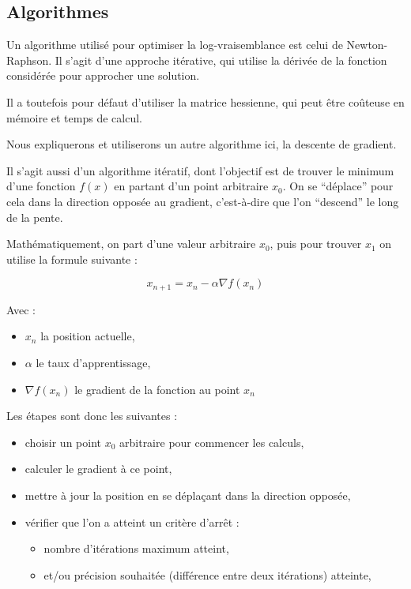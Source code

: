 \documentclass[10pt,french]{report}
\begin{document}
	\subsection{Algorithmes}

    Un algorithme utilisé pour optimiser la log-vraisemblance est celui de Newton-Raphson. Il s'agit d'une approche itérative, qui utilise la dérivée de la fonction considérée pour approcher une solution.

    Il a toutefois pour défaut d'utiliser la matrice hessienne, qui peut être coûteuse en mémoire et temps de calcul.

    Nous expliquerons et utiliserons un autre algorithme ici, la descente de gradient.

    Il s'agit aussi d'un algorithme itératif, dont l'objectif est de trouver le minimum d'une fonction $f\left(x\right)$ en partant d'un point arbitraire $x_0$. On se \enquote{déplace} pour cela dans la direction opposée au gradient, c'est-à-dire que l'on \enquote{descend} le long de la pente.

    Mathématiquement, on part d'une valeur arbitraire $x_0$, puis pour trouver $x_1$ on utilise la formule suivante :

    \begin{equation}
        x_{n+1} = x_n - \alpha \nabla f\left(x_n\right)
    \end{equation}

    Avec :
    \begin{itemize}
        \item $x_n$ la position actuelle,
        \item $\alpha$ le taux d'apprentissage,
        \item $\nabla f\left(x_n\right)$ le gradient de la fonction au point $x_n$
    \end{itemize}

    Les étapes sont donc les suivantes :
    \begin{itemize}
        \item choisir un point $x_0$ arbitraire pour commencer les calculs,
        \item calculer le gradient à ce point,
        \item mettre à jour la position en se déplaçant dans la direction opposée,
        \item vérifier que l'on a atteint un critère d'arrêt :
        \begin{itemize}
            \item nombre d'itérations maximum atteint,
            \item et/ou précision souhaitée (différence entre deux itérations) atteinte,
        \end{itemize}
    \end{itemize}
\end{document}
